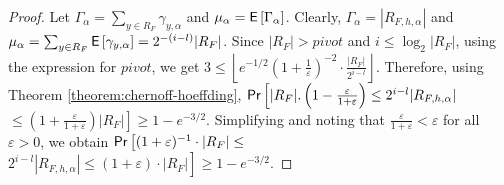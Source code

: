 \begin{proof}
Let $\Gamma_\alpha = \sum_{y \in R_F} \gamma_{y, \alpha}$ and
$\mu_\alpha = \mathsf{E}\left[\Gamma_\alpha\right]$.  Clearly,
$\Gamma_\alpha = |R_{F, h, \alpha}|$ and $\mu_\alpha = \sum_{y \in
  R_F} \mathsf{E}\left[\gamma_{y, \alpha}\right] = 2^{-(i-l)}|R_F|$.
Since $|R_F| > \mathit{pivot}$ and $i \leq \log_2 |R_F|$, using the expression for
$\mathit{pivot}$, we get $3 \le \left\lfloor e^{-1/2}(1 +
\frac{1}{\varepsilon})^{-2}\cdot\frac{|R_F|}{2^{i-l}}
\right\rfloor$. Therefore, using Theorem
\ref{theorem:chernoff-hoeffding},
$\mathsf{Pr}\left[|R_F|.\left(1-\frac{\varepsilon}{1+\varepsilon}\right) \leq
  2^{i-l}|R_{F,h,\alpha}|\right.$ $\left.\leq
  (1+\frac{\varepsilon}{1+\varepsilon})|R_F|\right] \ge 1- e^{-3/2}$.
 Simplifying and noting that $\frac{\varepsilon}{1+\varepsilon} <
\varepsilon$ for all $\varepsilon > 0$, we obtain
$\mathsf{Pr}\left[(1+\varepsilon)^{-1}\cdot |R_F| \leq \right.$ $\left. 
  2^{i-l}|R_{F,h,\alpha}|\leq (1+ \varepsilon)\cdot |R_F| \right] \ge 1- e^{-3/2}$.
\end{proof}

